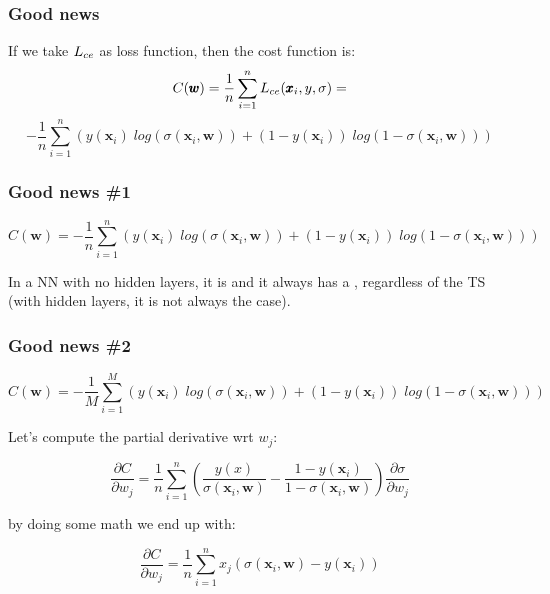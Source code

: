 \documentclass[usenames,dvipsnames]{beamer}
\begin{document}
\begin{frame}
  \frametitle{Good news}
  
  If we take $L_{ce}$ as loss function, then the cost function is:
  \[
  C(\pmb{w}) = \frac{1}{n} \sum_{i=1}^{n} L_{ce}(\pmb{x}_i, y, \sigma) = 
  \]
  \[ -\frac{1}{n} \sum_{i=1}^{n} (y(\pmb{x}_i) \; log(\sigma(\pmb{x}_i, \pmb{w})) + (1-y(\pmb{x}_i)) \; log(1 - \sigma(\pmb{x}_i, \pmb{w})))  \]
    
\end{frame}


\begin{frame}
  \frametitle{Good news \#1}
  
  \[ C(\pmb{w}) = -\frac{1}{n} \sum_{i=1}^{n} (y(\pmb{x}_i) \; log(\sigma(\pmb{x}_i, \pmb{w})) + (1-y(\pmb{x}_i)) \; log(1 - \sigma(\pmb{x}_i, \pmb{w})))  \]
  
    \begin{alertblock}{}
   \centering
In a NN with no hidden layers, it is  and it always has a , regardless of the TS (with hidden layers, it is not always the case).
  \end{alertblock}
  
  \end{frame}

\begin{frame}
\frametitle{Good news \#2}

  \[ C(\pmb{w}) = -\frac{1}{M} \sum_{i=1}^{M} (y(\pmb{x}_i) \; log(\sigma(\pmb{x}_i, \pmb{w})) + (1-y(\pmb{x}_i)) \; log(1 - \sigma(\pmb{x}_i, \pmb{w})))  \]

Let's compute the partial derivative wrt $w_j$:

\[
\frac{\partial C}{\partial w_j} = \frac{1}{n} \sum_{i=1}^n \left( \frac{y(x)}{ \sigma(\pmb{x}_i, \pmb{w} ) } - \frac{1-y(\pmb{x}_i)}{1 - \sigma(\pmb{x}_i, \pmb{w})} \right) \frac{\partial \sigma}{\partial w_j}
\]

by doing some math we end up with:

\[
\frac{\partial C}{\partial w_j} = \frac{1}{n} \sum_{i=1}^n x_j(\sigma(\pmb{x}_i, \pmb{w}) - y(\pmb{x}_i))
\]

\pause

\begin{alertblock}{}
\centering
\end{alertblock}


 \end{frame}
\end{document}
